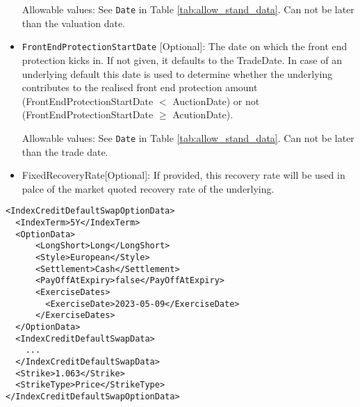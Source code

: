 \begin{itemize}
Allowable values: See \lstinline!Date! in Table \ref{tab:allow_stand_data}. Can not be later than the valuation date.
 
\item 
\lstinline!FrontEndProtectionStartDate! [Optional]: The date on which the front end protection kicks in. If not given,
it defaults to the TradeDate. In case of an underlying default this date is used to determine whether the underlying
contributes to the realised front end protection amount (FrontEndProtectionStartDate $<$ AuctionDate) or not
(FrontEndProtectionStartDate $\geq$ AcutionDate).
 
Allowable values: See \lstinline!Date! in Table \ref{tab:allow_stand_data}. Can not be later than the trade date.
 
\item FixedRecoveryRate[Optional]: If provided, this recovery rate will be used in palce of the market quoted recovery rate of the underlying.
  
\end{itemize}

\begin{listing}[H]
\begin{verbatim}
<IndexCreditDefaultSwapOptionData>
  <IndexTerm>5Y</IndexTerm>
  <OptionData>
      <LongShort>Long</LongShort>
      <Style>European</Style>
      <Settlement>Cash</Settlement>
      <PayOffAtExpiry>false</PayOffAtExpiry>
      <ExerciseDates>
        <ExerciseDate>2023-05-09</ExerciseDate>
      </ExerciseDates>
  </OptionData>
  <IndexCreditDefaultSwapData>
    ... 
  </IndexCreditDefaultSwapData>
  <Strike>1.063</Strike>
  <StrikeType>Price</StrikeType>
</IndexCreditDefaultSwapOptionData>
\end{verbatim}
\caption{Example Structure of \lstinline!IndexCreditDefaultSwapOptionData! node.}
\label{lst:indexcdsoptiondata}
\end{listing}

